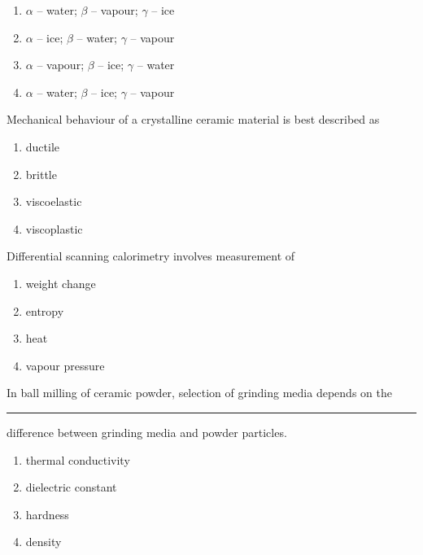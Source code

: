 \begin{multicols}{2}
\begin{enumerate}
\item $ \alpha $ -- water; $ \beta $ -- vapour; $ \gamma $ -- ice 
\item $ \alpha $ -- ice; $ \beta $ -- water; $ \gamma $ -- vapour
\item $\alpha $ -- vapour; $ \beta $ -- ice; $ \gamma $ -- water
\item $\alpha $ -- water; $ \beta $ -- ice; $ \gamma $ -- vapour
\end{enumerate}
\end{multicols}

\item Mechanical behaviour of a crystalline ceramic material is best described as

\begin{multicols}{4}
\begin{enumerate}
\item ductile
\item brittle
\item viscoelastic
\item viscoplastic
\end{enumerate}
\end{multicols}

\item Differential scanning calorimetry involves measurement of 
\begin{multicols}{4}
\begin{enumerate}
\item weight change
\item entropy 
\item heat 
\item vapour pressure
\end{enumerate}
\end{multicols}

\item In ball milling of ceramic powder, selection of grinding media depends on the
\rule{1cm}{0.4 pt} difference between grinding media and powder particles. 
\begin{multicols}{2}
\begin{enumerate}
\item thermal conductivity 
\item dielectric constant
\item hardness
\item density
\end{enumerate}
\end{multicols}

